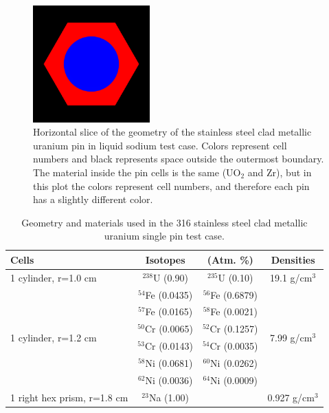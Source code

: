 \documentclass[preprint,12pt]{elsarticle}
\begin{document}
\begin{figure}[!htbp] 
  \centering
    \includegraphics[width=0.4\textwidth]{graphics/sodiumpin-xy.png}
     \caption{ Horizontal slice of the geometry of the stainless steel clad metallic uranium pin in liquid sodium test case.  Colors represent cell numbers and black represents space outside the outermost boundary.  The material inside the pin cells is the same (UO$_2$ and Zr), but in this plot the colors represent cell numbers, and therefore each pin has a slightly different color. \label{sodiumpin_geom_pic} }
\end{figure}

\begin{table}[h]
\centering
\caption{Geometry and materials used in the 316 stainless steel clad metallic uranium single pin test case.}
\label{sodium_geom}
\begin{tabular}{| l | c  c  | c |}
\hline
Cells & Isotopes & (Atm. \%)     & Densities \\
\hline
\multirow{1}{*}{1 cylinder, r=1.0 cm }   &  $^{238}$U   (0.90)   & $^{235}$U   (0.10)   &    \multirow{1}{*}{19.1 g/cm$^3$} \\
\hline
\multirow{6}{*}{1 cylinder, r=1.2 cm }   &  $^{54}$Fe  (0.0435) & $^{56}$Fe  (0.6879)  &   \multirow{6}{*}{7.99 g/cm$^3$} \\
                                         &  $^{57}$Fe  (0.0165) & $^{58}$Fe  (0.0021)  &   \\
                                         &  $^{50}$Cr  (0.0065) & $^{52}$Cr  (0.1257)  &   \\
                                         &  $^{53}$Cr  (0.0143) & $^{54}$Cr  (0.0035)  &   \\
                                         &  $^{58}$Ni  (0.0681) & $^{60}$Ni  (0.0262)  &   \\
                                         &  $^{62}$Ni  (0.0036) &  $^{64}$Ni  (0.0009) &   \\
\hline
1 right hex prism, r=1.8 cm              &  $^{23}$Na   (1.00)  &                      &    0.927 g/cm$^3$ \\
\hline
\end{tabular}
\end{table}
\end{document}
